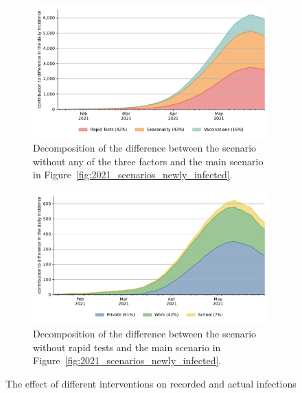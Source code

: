 \documentclass[12pt]{article}
\begin{document}
\begin{figure}[!tp]
    \begin{subfigure}[b]{0.475\textwidth}
        \centering
        \includegraphics[width=\textwidth]{../figures/results/figures/full_decomposition_channels_area}
        \caption{Decomposition of the difference between the scenario without any of the
            three factors and the main scenario in
            Figure~\ref{fig:2021_scenarios_newly_infected}.}
        \label{fig:2021_scenarios_decomposition}
    \end{subfigure}
    \hfill
    \begin{subfigure}[b]{0.475\textwidth}
        \centering
        \includegraphics[width=\textwidth]{../figures/results/figures/full_decomposition_rapid_tests_area}
        \caption{Decomposition of the difference between the scenario without rapid
            tests and the main scenario in
            Figure~\ref{fig:2021_scenarios_newly_infected}.}
        \label{fig:2021_scenarios_decomposition_tests}
    \end{subfigure}

    \caption{The effect of different interventions on recorded and actual infections}
    \label{fig:2021_scenarios_broad}


\end{figure}
\end{document}

